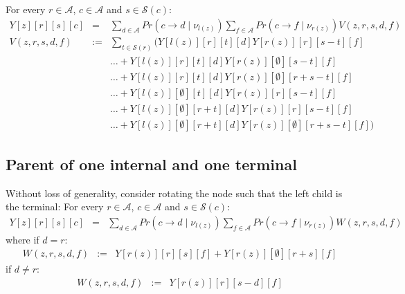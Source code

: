 \documentclass[11pt]{article}
\begin{document}
For every $r\in \mathcal{A}$, $c\in \mathcal{A}$ and $s\in\mathcal{S}(c)$:
\begin{eqnarray*}
Y[z][r][s][c] & = & \sum_{d\in \mathcal{A}}Pr(c\rightarrow d\mid \nu_{l(z)})\sum_{f\in \mathcal{A}}Pr(c\rightarrow f\mid \nu_{r(z)}) V(z, r, s, d, f) \\
V(z, r, s, d, f) & := &\sum_{t\in \mathcal{S}(r)}\Bigg(Y[l(z)][r][t][d] Y[r(z)][r][s - t][f]
\\ 
& & \ldots + Y[l(z)][r][t][d] Y[r(z)][\emptyset][s - t][f] \\
& & \ldots + Y[l(z)][r][t][d] Y[r(z)][\emptyset][r + s - t][f]\\
& & \ldots + Y[l(z)][\emptyset][t][d] Y[r(z)][r][s - t][f] \\
& & \ldots + Y[l(z)][\emptyset][r + t][d] Y[r(z)][r][s - t][f]\\
& & \ldots + Y[l(z)][\emptyset][r + t][d] Y[r(z)][\emptyset][r + s - t][f] \Bigg)
\end{eqnarray*}


\subsection{Parent of one internal and one terminal}
Without loss of generality, consider rotating the node such that 
the left child is the terminal:
For every $r\in \mathcal{A}$, $c\in \mathcal{A}$ and $s\in\mathcal{S}(c)$:
\begin{eqnarray*}
Y[z][r][s][c] & = & \sum_{d\in \mathcal{A}}Pr(c\rightarrow d\mid \nu_{l(z)})\sum_{f\in \mathcal{A}}Pr(c\rightarrow f\mid \nu_{r(z)}) W(z, r, s, d, f)
\end{eqnarray*}
where if $d = r$:
\begin{eqnarray*}
W(z, r, s, d, f) & := & Y[r(z)][r][s][f] + Y[r(z)][\emptyset][r + s][f]
\end{eqnarray*}
if $d \neq r$:
\begin{eqnarray*}
W(z, r, s, d, f) & := &Y[r(z)][r][s - d][f]
\end{eqnarray*}


\end{document}
